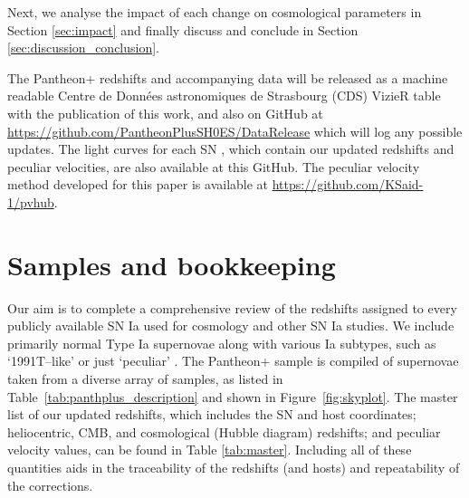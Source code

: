 \documentclass[
  journal=pasa,
  manuscript=research-paper,
  year=2022,
]{cup-journal}
\newcommand{\data}{\url{https://github.com/PantheonPlusSH0ES/DataRelease}}
\newcommand{\pvcode}{\url{https://github.com/KSaid-1/pvhub}}
\begin{document}
Next, we analyse the impact of each change on cosmological parameters in Section \ref{sec:impact} and finally discuss and conclude in Section \ref{sec:discussion_conclusion}.

The Pantheon+ redshifts and accompanying data will be released as a machine readable Centre de Donn\'{e}es astronomiques de Strasbourg (CDS) VizieR table with the publication of this work, and also on GitHub at \data{} which will log any possible updates.
The light curves for each SN \citep[see][]{Scolnic2022samples}, which contain our updated redshifts and peculiar velocities, are also available at this GitHub.
The peculiar velocity method developed for this paper is available at \pvcode{}.

\section{Samples and bookkeeping}\label{sec:sample_description}
Our aim is to complete a comprehensive review of the redshifts assigned to every publicly available SN Ia used for cosmology and other SN Ia studies.  
We include primarily normal Type Ia supernovae along with various Ia subtypes, such as `1991T--like' or just `peculiar' \citep{Li2001}. 
The Pantheon+ sample is compiled of supernovae taken from a diverse array of samples, as listed in Table~\ref{tab:panthplus_description} and shown in Figure~\ref{fig:skyplot}.
The master list of our updated redshifts, which includes the SN and host coordinates; heliocentric, CMB, and cosmological (Hubble diagram) redshifts; and peculiar velocity values, can be found in Table \ref{tab:master}.  
Including all of these quantities aids in the traceability of the redshifts (and hosts) and repeatability of the corrections.
\end{document}
